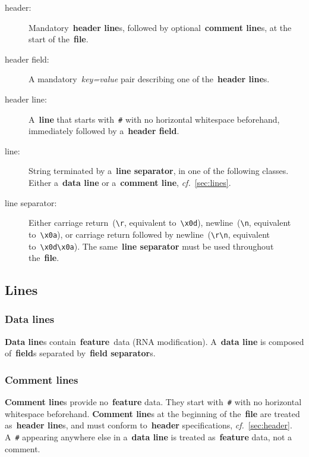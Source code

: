 \documentclass[11pt]{article}
\begin{document}
\begin{description}
\item[header:]
  Mandatory~\textbf{header line}s, followed by optional~\textbf{comment line}s, at the start of the~\textbf{file}.

\item[header field:]
  A mandatory~\emph{key=value} pair describing one of the~\textbf{header line}s. 
  
\item[header line:]
  A~\textbf{line} that starts with~\texttt{\#} with no horizontal whitespace beforehand, immediately followed by a~\textbf{header field}.
  
\item[line:]
  String terminated by a~\textbf{line separator}, in one of the following classes.
  Either a~\textbf{data line} or a~\textbf{comment line}, \textit{cf.}~\autoref{sec:lines}.

\item[line separator:]
  Either carriage return~(\texttt{{\textbackslash}r}, equivalent to~\texttt{{\textbackslash}x0d}), newline~(\texttt{{\textbackslash}n}, equivalent to~\texttt{{\textbackslash}x0a}), or carriage return followed by newline~(\texttt{{\textbackslash}r{\textbackslash}n}, equivalent to~\texttt{{\textbackslash}x0d{\textbackslash}x0a}).
  The same~\textbf{line separator} must be used throughout the~\textbf{file}.
\end{description}

\subsection{Lines}\label{sec:lines}

\subsubsection{Data lines}

\textbf{Data line}s contain~\textbf{feature}~data (RNA modification).
A~\textbf{data line} is composed of~\textbf{field}s separated by~\textbf{field separator}s.

\subsubsection{Comment lines}

\textbf{Comment line}s provide no~\textbf{feature} data. They start with~\texttt{\#} with no horizontal whitespace beforehand.
\textbf{Comment line}s at the beginning of the~\textbf{file} are treated as~\textbf{header line}s, and must conform to~\textbf{header} specifications, \textit{cf.}~\autoref{sec:header}. A~\texttt{\#} appearing anywhere else in a~\textbf{data line} is treated as~\textbf{feature} data, not a comment.
\end{document}
